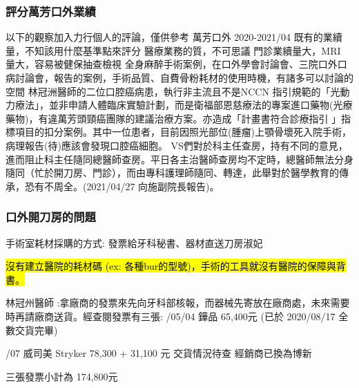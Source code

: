 \documentclass[t,24pt,aspectratio=169]{beamer}
\begin{document}
\begin{frame}[hoved]
\frametitle{評分萬芳口外業績}
\begin{outline}
\1 以下的觀察加入力行個人的評論，僅供參考
    \2 萬芳口外 2020-2021/04 既有的業續量，不知該用什麼基準點來評分
    \2 醫療業務的質，不可思議
        \3 門診業續量大，MRI 量大，容易被健保抽查檢視
        \3 全身麻醉手術案例，在口外學會討論會、三院口外口病討論會，報告的案例，手術品質、自費骨粉耗材的使用時機，有諸多可以討論的空間
        \3 林冠洲醫師的二位口腔癌病患，執行非主流且不是NCCN 指引規範的「光動力療法」，並非申請人體臨床實驗計劃，而是衛福部恩慈療法的專案進口藥物(光療藥物)，有違萬芳頭頸癌團隊的建議治療方案。亦造成「計畫書符合診療指引 」指標項目的扣分案例。其中一位患者，目前因照光部位(腫瘤)上顎骨壞死入院手術，病理報告(待)應該會發現口腔癌細胞。
        \3 VS們對於科主任查房，持有不同的意見，進而阻止科主任隨同總醫師查房。平日各主治醫師查房均不定時，總醫師無法分身隨同（忙於開刀房、門診），而由專科護理師隨同、轉達，此舉對於醫學教育的傳承，恐有不周全。(2021/04/27 向施副院長報告)。
    
\end{outline}


\end{frame}

\begin{frame}[hoved]
\frametitle{口外開刀房的問題}
手術室耗材採購的方式: 發票給牙科秘書、器材直送刀房淑妃

\hl{
沒有建立醫院的耗材碼 (ex: 各種bur的型號)，手術的工具就沒有醫院的保障與背書。
}



\begin{outline}
\1 林冠州醫師 :拿廠商的發票來先向牙科部核報，而器械先寄放在廠商處，未來需要時再請廠商送貨。經查閱發票有三張:
/05/04 鏵品 65,400元 (已於 2020/08/17 全數交貨完畢)

/07 威司美 Stryker 78,300 + 31,100 元
    \3 交貨情況待查
     經銷商已換為博新

\1 三張發票小計為 174,800元

\end{outline}



\end{frame}
\end{document}
